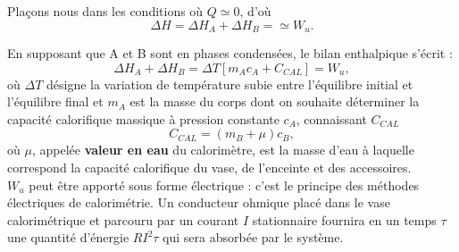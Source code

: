 \documentclass[11pt,a4paper]{report}
\begin{document}
Plaçons nous dans les conditions où $Q \simeq 0$, d'où
\begin{equation}
	\Delta H = \Delta H_A + \Delta H_B = \simeq W_u.
\end{equation}

En supposant que A et B sont en phases condensées, le bilan enthalpique s'écrit :
\begin{equation}
	\Delta H_A + \Delta H_B = \Delta T\left[m_A c_A + C_{CAL} \right] = W_u,
\end{equation}
où $\Delta T$ désigne la variation de température subie entre l'équilibre initial et l'équilibre final et $m_A$ est la masse du corps dont on souhaite déterminer la capacité calorifique massique à pression constante $c_A$, connaissant $C_{CAL}$
\begin{equation}
	C_{CAL} = (m_B + \mu)c_B, 
\end{equation}
où $\mu$, appelée \textbf{valeur en eau} du calorimètre, est la masse d'eau à laquelle correspond la capacité calorifique du vase, de l'enceinte et des accessoires.\\

$W_u$ peut être apporté sous forme électrique : c'est le principe des méthodes électriques de calorimétrie. Un conducteur ohmique placé dans le vase calorimétrique et parcouru par un courant $I$ stationnaire fournira en un temps $\tau$ une quantité d'énergie $RI^2\tau$ qui sera absorbée par le système.\\
\end{document}
